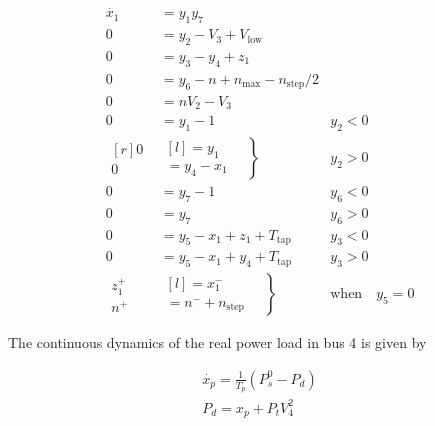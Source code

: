 \documentclass{article}	%
\begin{document}
\begin{align*}
\dot{x_1}                   & =y_1y_7                                    \\
0                           & = y_2-V_3 + V_\text{low}                   \\
0                           & = y_3 - y_4 + z_1                          \\
0                           & = y_6 - n + n_\text{max} - n_\text{step}/2 \\
0                           & = nV_2-V_3                                 \\
0                           & = y_1 -1                   & y_2<0         \\
 \begin{matrix*}[r]
    0                                                                    \\0
  \end{matrix*}
                            &
\left.\begin{matrix*}[l]
= y_1                                                                    \\
= y_4-x_1
\end{matrix*}\quad\right\} & y_2>0                                      \\
0                           & = y_7 -1                   & y_6<0         \\
0                           & = y_7                      & y_6>0         \\
0                           & = y_5-x_1+z_1+T_\text{tap} & y_3<0         \\
0                           & = y_5-x_1+y_4+T_\text{tap} & y_3>0         \\
  \begin{matrix*}
    z_1^+                                                                \\  n^+
  \end{matrix*}
                            & \left.\begin{matrix*}[l]
= x_1^-                                                                  \\
= n^-+n_\text{step}
\end{matrix*}\quad\right\} & \text{when} \quad y_5=0
\end{align*}

The continuous dynamics of the real power load in bus 4 is given by

\begin{align*}
\dot{x_p} = \frac{1}{T_p} (P_s^0-P_d)\\
P_d = x_p + P_t V_4^2
\end{align*}
\end{document}
